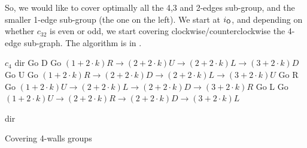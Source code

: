 \documentclass[a4paper,11pt]{article}
\theoremstyle{definition}
\newcommand{\opp}{{{\sf O}}\xspace}
\newcommand{\io}{{\ensuremath{i_{\opp}}}\xspace}
\begin{document}
So, we would like to cover optimally all the 4,3 and 2-edges sub-group, and the smaller 1-edge sub-group (the one on the left).
We start at \io, and depending on whether $c_{32}$ is even or odd, we start covering clockwise/counterclockwise the 4-edge sub-graph.
The algorithm is in .
\begin{algorithm}
    \begin{algorithmic}
    \REQUIRE $c_4$
    \REQUIRE dir
        \STATE Go D
            \STATE Go $\left(1+2\cdot k\right) R \to \left(2+2\cdot k\right) U \to \left(2+2\cdot k\right) L \to \left(3+2\cdot k\right) D$
        \ENDFOR
        \STATE Go U
            \STATE Go $\left(1+2\cdot k\right) R \to \left(2+2\cdot k\right) D \to \left(2+2\cdot k\right) L \to \left(3+2\cdot k\right) U$
        \ENDFOR
        \STATE Go R
            \STATE Go $\left(1+2\cdot k\right) U \to \left(2+2\cdot k\right) L \to \left(2+2\cdot k\right) D \to \left(3+2\cdot k\right) R$
        \ENDFOR
        \STATE Go L
            \STATE Go $\left(1+2\cdot k\right) U \to \left(2+2\cdot k\right) R \to \left(2+2\cdot k\right) D \to \left(3+2\cdot k\right) L$
            
        \ENDFOR
    \ENDIF
    \RETURN dir
    \end{algorithmic}
    \caption{Covering 4-walls groups}
    \label{algorithms: 4-walls coverage}
\end{algorithm}
\end{document}

